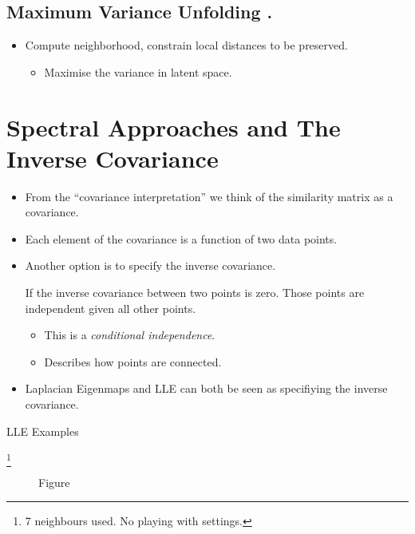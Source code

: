 \section{Maximum Variance Unfolding \cite{Weinberger:learning04}.}
\begin{itemize}
\item Compute neighborhood, constrain local distances to be preserved.

\begin{itemize}
\item Maximise the variance in latent space.
\end{itemize}
\end{itemize}

\chapter{Spectral Approaches and The Inverse Covariance}

\begin{itemize}
\item From the {}``covariance interpretation'' we think of the similarity
matrix as a covariance.
\item Each element of the covariance is a function of two data points.
\item Another option is to specify the inverse covariance.


If the inverse covariance between two points is zero. Those points
are independent given all other points.
\begin{itemize}
\item This is a \emph{conditional independence}. 
\item Describes how points are connected.
\end{itemize}
\item Laplacian Eigenmaps and LLE can both be seen as specifiying the inverse
covariance.
\end{itemize}
LLE Examples

%
\footnote{7 neighbours used. No playing with settings.%
}

%
\begin{figure}
\hfill{}


\hfill{}

\hfill{}\caption{Figure}

\end{figure}


